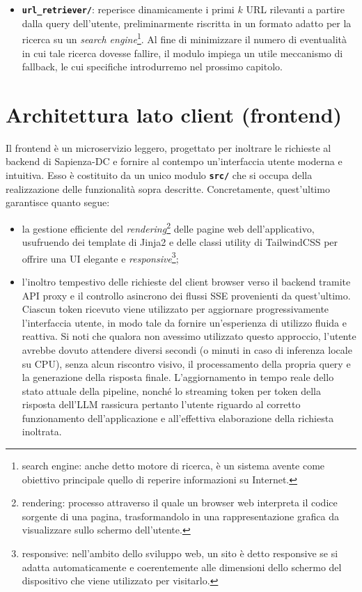\begin{itemize}
    \item \texttt{\textbf{url\_retriever/}}: reperisce dinamicamente i primi $k$ URL rilevanti a partire dalla query dell'utente, preliminarmente riscritta in un formato adatto per la ricerca su un \textit{search engine}\footnote{search engine: anche detto motore di ricerca, è un sistema avente come obiettivo principale quello di reperire informazioni su Internet.}. Al fine di minimizzare il numero di eventualità in cui tale ricerca dovesse fallire, il modulo impiega un utile meccanismo di fallback, le cui specifiche introdurremo nel prossimo capitolo.                       
\end{itemize}

\section{Architettura lato client (frontend)}
Il frontend è un microservizio leggero, progettato per inoltrare le richieste al backend di Sapienza-DC e fornire al contempo un'interfaccia utente moderna e intuitiva. Esso è costituito da un unico modulo \texttt{\textbf{src/}} che si occupa della realizzazione delle funzionalità sopra descritte. Concretamente, quest'ultimo garantisce quanto segue:

\begin{itemize}
    \item la gestione efficiente del \textit{rendering}\footnote{rendering: processo attraverso il quale un browser web interpreta il codice sorgente di una pagina, trasformandolo in una rappresentazione grafica da visualizzare sullo schermo dell'utente.} delle pagine web dell'applicativo, usufruendo dei template di Jinja2 e delle classi utility di TailwindCSS per offrire una UI elegante e \textit{responsive}\footnote{responsive: nell'ambito dello sviluppo web, un sito è detto responsive se si adatta automaticamente e coerentemente alle dimensioni dello schermo del dispositivo che viene utilizzato per visitarlo.};
    \item l'inoltro tempestivo delle richieste del client browser verso il backend tramite API proxy e il controllo asincrono dei flussi SSE provenienti da quest'ultimo. Ciascun token ricevuto viene utilizzato per aggiornare progressivamente l'interfaccia utente, in modo tale da fornire un'esperienza di utilizzo fluida e reattiva. Si noti che qualora non avessimo utilizzato questo approccio, l'utente avrebbe dovuto attendere diversi secondi (o minuti in caso di inferenza locale su CPU), senza alcun riscontro visivo, il processamento della propria query e la generazione della risposta finale. L'aggiornamento in tempo reale dello stato attuale della pipeline, nonché lo streaming token per token della risposta dell'LLM rassicura pertanto l'utente riguardo al corretto funzionamento dell'applicazione e all'effettiva elaborazione della richiesta inoltrata. 
\end{itemize}


